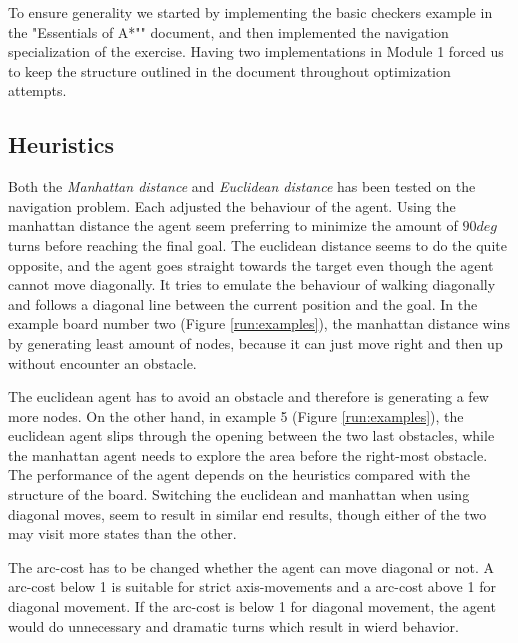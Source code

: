 To ensure generality we started by implementing the basic checkers example in
the "Essentials of A*"" document, and then implemented the navigation specialization
of the exercise. Having two implementations in Module 1 forced us to keep the
structure outlined in the document throughout optimization attempts.

\subsection{Heuristics}
Both the \emph{Manhattan distance} and \emph{Euclidean distance} has been tested on the navigation problem. Each adjusted the behaviour of the agent. Using the manhattan distance the agent seem preferring to minimize the amount of \(90 deg\) turns before reaching the final goal. The euclidean distance seems to do the quite opposite, and the agent goes straight towards the target even though the agent cannot move diagonally. It tries to emulate the behaviour of walking diagonally and follows a diagonal line between the current position and the goal. In the example board number two (Figure \ref{run:examples}), the manhattan distance wins by generating least amount of nodes, because it can just move right and then up without encounter an obstacle. 

The euclidean agent has to avoid an obstacle and therefore is generating a few more nodes. On the other hand, in example 5 (Figure \ref{run:examples}), the euclidean agent slips through the opening between the two last obstacles, while the manhattan agent needs to explore the area before the right-most obstacle. The performance of the agent depends on the heuristics compared with the structure of the board. Switching the euclidean and manhattan when using diagonal moves, seem to result in similar end results, though either of the two may visit more states than the other.

The arc-cost has to be changed whether the agent can move diagonal or not. A arc-cost below 1 is suitable for strict axis-movements and a arc-cost above 1 for diagonal movement. If the arc-cost is below 1 for diagonal movement, the agent would do unnecessary and dramatic turns which result in wierd behavior.


